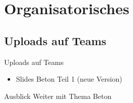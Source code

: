 

\section{Organisatorisches}
\BlueSectionSlide

\subsection{Uploads auf Teams}
\begin{frame}{Uploads auf Teams}
    \begin{itemize}
        \item[\textbullet] Slides Beton Teil 1 (neue Version)
    \end{itemize}

\end{frame}




\begin{frame}{Ausblick}
    Weiter mit Thema Beton

\end{frame}


